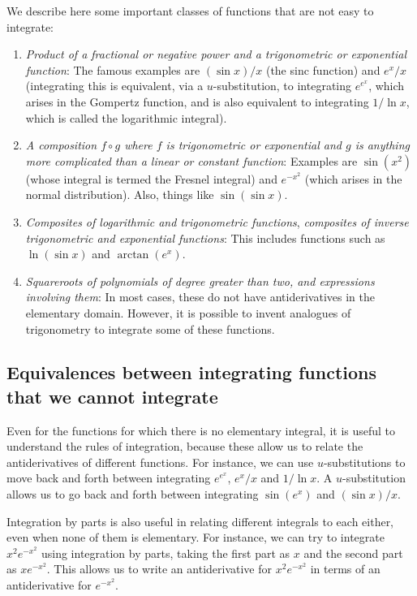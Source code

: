 \documentclass{amsart}
\begin{document}
We describe here some important classes of functions that are not easy
to integrate:

\begin{enumerate}
\item {\em Product of a fractional or negative power and a
  trigonometric or exponential function}: The famous examples are
  $(\sin x)/x$ (the sinc function) and $e^x/x$ (integrating this is
  equivalent, via a $u$-substitution, to integrating $e^{e^x}$, which
  arises in the Gompertz function, and is also equivalent to
  integrating $1/\ln x$, which is called the logarithmic integral).
\item {\em A composition $f \circ g$ where $f$ is trigonometric or
  exponential and $g$ is anything more complicated than a linear or
  constant function}: Examples are $\sin(x^2)$ (whose integral is
  termed the Fresnel integral) and $e^{-x^2}$ (which arises in the
  normal distribution). Also, things like $\sin(\sin x)$.
\item {\em Composites of logarithmic and trigonometric functions},
  {\em composites of inverse trigonometric and exponential functions}:
  This includes functions such as $\ln(\sin x)$ and $\arctan(e^x)$.
\item {\em Squareroots of polynomials of degree greater than two, and
  expressions involving them}: In most cases, these do not have
  antiderivatives in the elementary domain. However, it is possible to
  invent analogues of trigonometry to integrate some of these functions.
\end{enumerate}

\subsection{Equivalences between integrating functions that we cannot integrate}

Even for the functions for which there is no elementary integral, it
is useful to understand the rules of integration, because these allow
us to relate the antiderivatives of different functions. For instance,
we can use $u$-substitutions to move back and forth between
integrating $e^{e^x}$, $e^x/x$ and $1/\ln x$. A $u$-substitution
allows us to go back and forth between integrating $\sin(e^x)$ and
$(\sin x)/x$.

Integration by parts is also useful in relating different integrals to
each either, even when none of them is elementary. For instance, we
can try to integrate $x^2e^{-x^2}$ using integration by parts, taking
the first part as $x$ and the second part as $xe^{-x^2}$. This allows
us to write an antiderivative for $x^2 e^{-x^2}$ in terms of an
antiderivative for $e^{-x^2}$.
\end{document}
